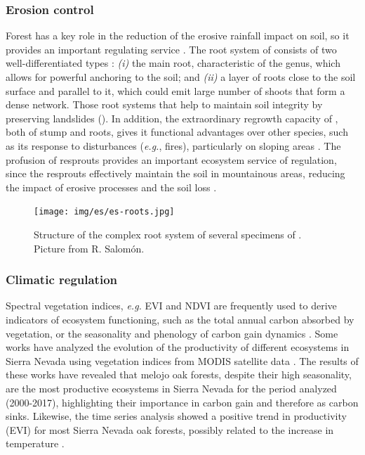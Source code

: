 \subsubsection{Erosion control}\label{sec:es:regulation-erosion}
Forest has a key role in the reduction of the erosive rainfall impact on soil, so it provides an important regulating service \autocites{Zhongmingetal2010StratifiedVegetation,GarciaRuizetal2011MediterraneanWater}. The root system of \Qp consists of two well-differentiated types \autocites{Allue1995OrdenacionMasas}: \emph{(i)} the main root, characteristic of the genus, which allows for powerful anchoring to the soil; and \emph{(ii)} a layer of roots close to the soil surface and parallel to it, which could emit large number of shoots that form a dense network. Those root systems that help to maintain soil integrity by preserving landslides \autocites{MesonMontoya1985VegetacionForestal,Salomonetal2017GeneralFailure} (). In addition, the extraordinary regrowth capacity of \Qp, both of stump and roots, gives it functional advantages over other species, such as its response to disturbances (\emph{e.g.}, fires), particularly on sloping areas \autocites{RuizdelaTorre2006FloraMayor,ValbuenaCarabanaGil2017CentenaryCoppicing}. The profusion of resprouts provides an important ecosystem service of regulation, since the resprouts effectively maintain the soil in mountainous areas, reducing the impact of erosive processes and the soil loss  \autocites{MesonGarcia1984BasesEcologicas}.

\begin{figure}
    \centering
    \texttt{[image: img/es/es-roots.jpg]}\caption{Structure of the complex root system of several specimens of \Qp. Picture from R. Salomón.}\label{fig:es:roots}
\end{figure}

\subsubsection{Climatic regulation}\label{sec:es:regulation-climatic}
Spectral vegetation indices, \emph{e.g.} EVI and NDVI are frequently used to derive indicators of ecosystem functioning, such as the total annual carbon absorbed by vegetation, or the seasonality and phenology of carbon gain dynamics \autocites{Xiaoetal2019RemoteSensing,
AlcarazSeguraetal2009BaselineCharacterization,AlcarazSeguraetal2009UseDescriptors,Cazorlaetal2020RemoteSensingbased}. Some works have analyzed the evolution of the productivity of different ecosystems in Sierra Nevada using vegetation indices from MODIS satellite data \autocites{Dionisioetal2012SatelliteBasedMonitoring,Alcaraz2016obsnev_ndvi,PerezLuque2015onto,Cazorlaetal2020RemoteSensingbased}. The results of these works have revealed that melojo oak forests, despite their high seasonality, are the most productive ecosystems in Sierra Nevada for the period analyzed (2000-2017), highlighting their importance in carbon gain and therefore as carbon sinks. Likewise, the time series analysis showed a positive trend in productivity (EVI) for most Sierra Nevada oak forests, possibly related to the increase in temperature \autocite{PerezLuque2015onto}. 


